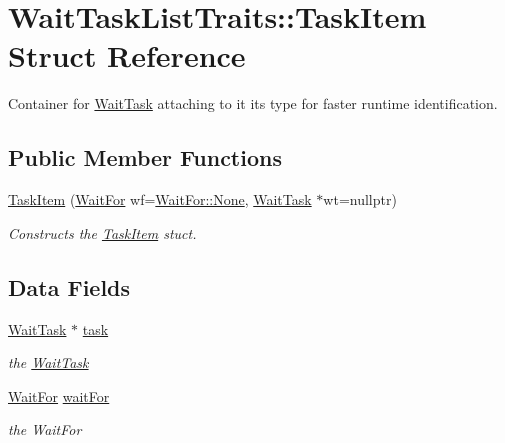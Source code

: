 \hypertarget{struct_wait_task_list_traits_1_1_task_item}{}\section{Wait\+Task\+List\+Traits\+:\+:Task\+Item Struct Reference}
\label{struct_wait_task_list_traits_1_1_task_item}


Container for \hyperlink{class_wait_task}{Wait\+Task} attaching to it its type for faster runtime identification.  


\subsection*{Public Member Functions}
\begin{DoxyCompactItemize}
\item 
\hyperlink{struct_wait_task_list_traits_1_1_task_item_a6bf127a8e7b4c7a05e2957035e252366}{Task\+Item} (\hyperlink{namespace_wait_task_list_traits_a3cb74ee1929f03e51486087ef21caf9f}{Wait\+For} wf=\hyperlink{namespace_wait_task_list_traits_a3cb74ee1929f03e51486087ef21caf9fa6adf97f83acf6453d4a6a4b1070f3754}{Wait\+For\+::\+None}, \hyperlink{class_wait_task}{Wait\+Task} $\ast$wt=nullptr)
\begin{DoxyCompactList}\small\item\em Constructs the \hyperlink{struct_wait_task_list_traits_1_1_task_item}{Task\+Item} stuct. \end{DoxyCompactList}\end{DoxyCompactItemize}
\subsection*{Data Fields}
\begin{DoxyCompactItemize}
\item 
\hypertarget{struct_wait_task_list_traits_1_1_task_item_a1e715ba11a4776b3d798538fe75bacd6}{}\hyperlink{class_wait_task}{Wait\+Task} $\ast$ \hyperlink{struct_wait_task_list_traits_1_1_task_item_a1e715ba11a4776b3d798538fe75bacd6}{task}\label{struct_wait_task_list_traits_1_1_task_item_a1e715ba11a4776b3d798538fe75bacd6}

\begin{DoxyCompactList}\small\item\em the \hyperlink{class_wait_task}{Wait\+Task} \end{DoxyCompactList}\item 
\hypertarget{struct_wait_task_list_traits_1_1_task_item_a102b0dbbd5d466f5a05091d914fa8d61}{}\hyperlink{namespace_wait_task_list_traits_a3cb74ee1929f03e51486087ef21caf9f}{Wait\+For} \hyperlink{struct_wait_task_list_traits_1_1_task_item_a102b0dbbd5d466f5a05091d914fa8d61}{wait\+For}\label{struct_wait_task_list_traits_1_1_task_item_a102b0dbbd5d466f5a05091d914fa8d61}

\begin{DoxyCompactList}\small\item\em the Wait\+For \end{DoxyCompactList}\end{DoxyCompactItemize}


